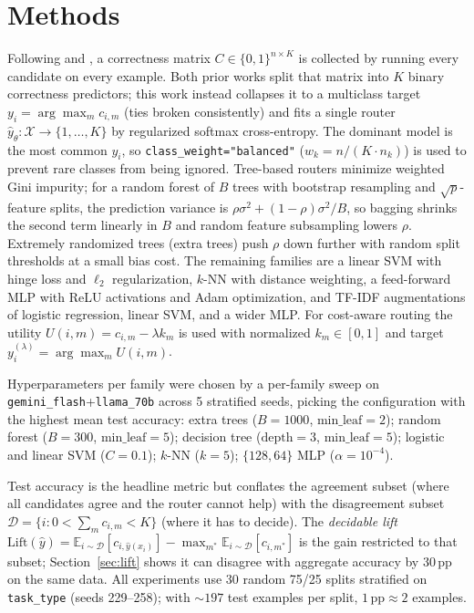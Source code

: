 \documentclass[11pt]{article}
\begin{document}
\section{Methods}
\label{sec:methods}
Following \citet{shnitzer2023llm} and \citet{routerbench}, a correctness matrix $C\in\{0,1\}^{n\times K}$ is collected by running every candidate on every example. Both prior works split that matrix into $K$ binary correctness predictors; this work instead collapses it to a multiclass target $y_i=\arg\max_m c_{i,m}$ (ties broken consistently) and fits a single router $\hat{y}_\theta:\mathcal{X}\to\{1,\dots,K\}$ by regularized softmax cross-entropy. The dominant model is the most common $y_i$, so \texttt{class\_weight="balanced"} ($w_k = n/(K\cdot n_k)$) is used to prevent rare classes from being ignored. Tree-based routers minimize weighted Gini impurity; for a random forest of $B$ trees with bootstrap resampling and $\sqrt{p}$-feature splits, the prediction variance is $\rho\sigma^2 + (1-\rho)\sigma^2/B$, so bagging shrinks the second term linearly in $B$ and random feature subsampling lowers $\rho$. Extremely randomized trees (extra trees) push $\rho$ down further with random split thresholds at a small bias cost. The remaining families are a linear SVM with hinge loss and $\ell_2$ regularization, $k$-NN with distance weighting, a feed-forward MLP with ReLU activations and Adam optimization, and TF-IDF augmentations of logistic regression, linear SVM, and a wider MLP. For cost-aware routing the utility $U(i,m)=c_{i,m}-\lambda k_m$ is used with normalized $k_m\in[0,1]$ and target $y_i^{(\lambda)}=\arg\max_m U(i,m)$.

Hyperparameters per family were chosen by a per-family sweep on \texttt{gemini\_flash}+\texttt{llama\_70b} across 5 stratified seeds, picking the configuration with the highest mean test accuracy: extra trees ($B{=}1000$, $\textrm{min\_leaf}{=}2$); random forest ($B{=}300$, $\textrm{min\_leaf}{=}5$); decision tree ($\textrm{depth}{=}3$, $\textrm{min\_leaf}{=}5$); logistic and linear SVM ($C{=}0.1$); $k$-NN ($k{=}5$); $\{128,64\}$ MLP ($\alpha{=}10^{-4}$).

Test accuracy is the headline metric but conflates the agreement subset (where all candidates agree and the router cannot help) with the disagreement subset $\mathcal{D}=\{i:0<\sum_m c_{i,m}<K\}$ (where it has to decide). The \emph{decidable lift} $\mathrm{Lift}(\hat{y})=\mathbb{E}_{i\sim\mathcal{D}}[c_{i,\hat{y}(x_i)}]-\max_{m^*}\mathbb{E}_{i\sim\mathcal{D}}[c_{i,m^*}]$ is the gain restricted to that subset; Section~\ref{sec:lift} shows it can disagree with aggregate accuracy by 30\,pp on the same data. All experiments use 30 random 75/25 splits stratified on \texttt{task\_type} (seeds 229--258); with $\sim 197$ test examples per split, $1\,\text{pp}\approx 2$ examples.
\end{document}
